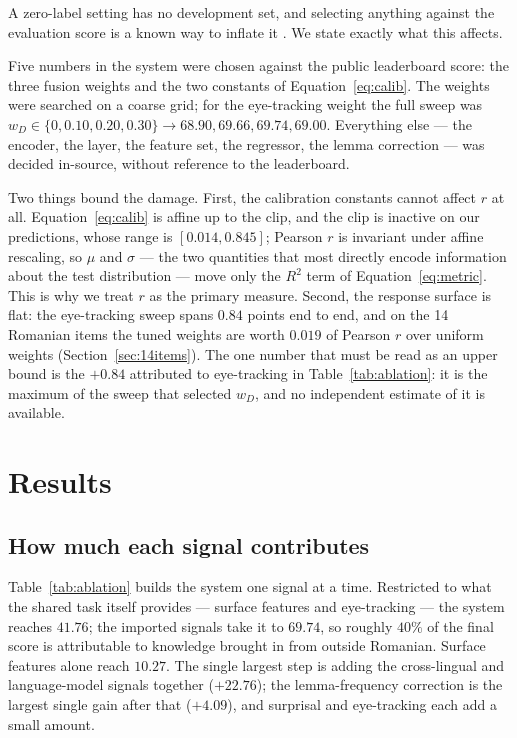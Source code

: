 \documentclass[11pt]{article}
\begin{document}
A zero-label setting has no development set, and selecting anything
against the evaluation score is a known way to inflate it
\citep{gorman-bedrick-2019-need}. We state exactly what this affects.

Five numbers in the system were chosen against the public leaderboard
score: the three fusion weights and the two constants of
Equation~\ref{eq:calib}. The weights were searched on a coarse grid;
for the eye-tracking weight the full sweep was
$w_D \in \{0, 0.10, 0.20, 0.30\} \rightarrow 68.90, 69.66, 69.74,
69.00$. Everything else --- the encoder, the layer, the feature set,
the regressor, the lemma correction --- was decided in-source, without
reference to the leaderboard.

Two things bound the damage. First, the calibration constants cannot
affect $r$ at all. Equation~\ref{eq:calib} is affine up to the clip,
and the clip is inactive on our predictions, whose range is
$[0.014, 0.845]$; Pearson $r$ is invariant under affine rescaling, so
$\mu$ and $\sigma$ --- the two quantities that most directly encode
information about the test distribution --- move only the $R^2$ term of
Equation~\ref{eq:metric}. This is why we treat $r$ as the primary
measure. Second, the response surface is flat: the eye-tracking sweep
spans $0.84$ points end to end, and on the 14 Romanian items the tuned
weights are worth $0.019$ of Pearson $r$ over uniform weights
(Section~\ref{sec:14items}). The one number that must be read as an
upper bound is the $+0.84$ attributed to eye-tracking in
Table~\ref{tab:ablation}: it is the maximum of the sweep that selected
$w_D$, and no independent estimate of it is available.

\section{Results}
\label{sec:results}

\subsection{How much each signal contributes}

Table~\ref{tab:ablation} builds the system one signal at a time.
Restricted to what the shared task itself provides --- surface features
and eye-tracking --- the system reaches $41.76$; the imported signals
take it to $69.74$, so roughly $40\%$ of the final score is
attributable to knowledge brought in from outside Romanian. Surface
features alone reach $10.27$. The single largest step is adding the
cross-lingual and language-model signals together ($+22.76$); the
lemma-frequency correction is the largest single gain after that
($+4.09$), and surprisal and eye-tracking each add a small amount.
\end{document}
